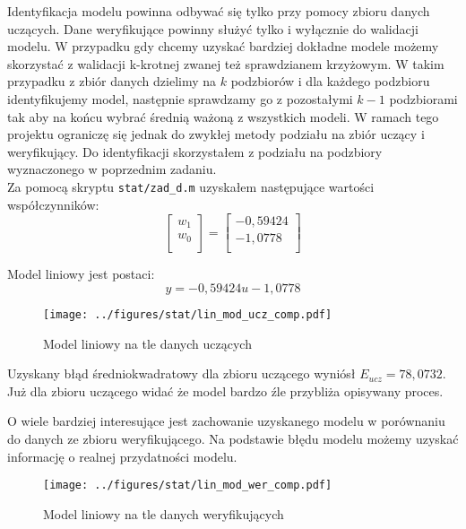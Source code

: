 \documentclass[a4paper,titlepage,11pt,floatssmall]{mwrep}
\begin{document}
Identyfikacja modelu powinna odbywać się tylko przy pomocy zbioru danych uczących. Dane weryfikujące powinny służyć tylko i wyłącznie do walidacji modelu. W przypadku gdy chcemy uzyskać bardziej dokładne modele możemy skorzystać z walidacji k-krotnej zwanej też sprawdzianem krzyżowym. W takim przypadku z zbiór danych dzielimy na $k$ podzbiorów i dla każdego podzbioru identyfikujemy model, następnie sprawdzamy go z pozostałymi $k-1$ podzbiorami tak aby na końcu wybrać średnią ważoną z wszystkich modeli. W ramach tego projektu ograniczę się jednak do zwykłej metody podziału na zbiór uczący i weryfikujący. Do identyfikacji skorzystałem z podziału na podzbiory wyznaczonego w poprzednim zadaniu.\\
\indent Za pomocą skryptu \texttt{stat/zad\_{}d.m} uzyskałem następujące wartości współczynników:
$$
\left[\begin{array}{c}
w_1 \\
w_0 \\
\end{array} \right]
= 
\left[\begin{array}{c}
-0,59424 \\
-1,0778 \\
\end{array} \right]
$$

Model liniowy jest postaci:
\begin{equation*}
y = -0,59424u -1,0778 
\end{equation*}

\begin{figure}[H]
\centering
\texttt{[image: ../figures/stat/lin\_mod\_ucz\_comp.pdf]}
\caption{Model liniowy na tle danych uczących}
\end{figure}

Uzyskany błąd średniokwadratowy dla zbioru uczącego wyniósł $E_{ucz} = 78,0732$. Już dla zbioru uczącego widać że model bardzo źle przybliża opisywany proces.

\indent O wiele bardziej interesujące jest zachowanie uzyskanego modelu w porównaniu do danych ze zbioru weryfikującego. Na podstawie błędu modelu możemy uzyskać informację o realnej przydatności modelu.
\begin{figure}[H]
\centering
\texttt{[image: ../figures/stat/lin\_mod\_wer\_comp.pdf]}
\caption{Model liniowy na tle danych weryfikujących}
\end{figure}
\end{document}
